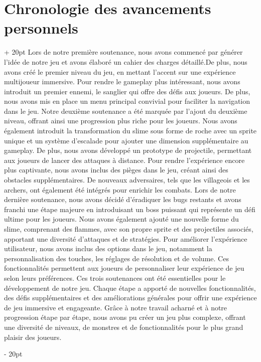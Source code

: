 \documentclass[a4paper, 12pt, twoside]{article}
\newcommand{\ind}[1][20pt]{\advance\leftskip + #1}
\newcommand{\deind}[1][20pt]{\advance\leftskip - #1}
\newenvironment{indt}[2][20pt]{#2 \par \ind[#1]}{\par \deind} %
\begin{document}
    \begin{indt}{\section{Chronologie des avancements personnels}}
        Lors de notre première soutenance, nous avons commencé par générer l'idée de notre jeu et avons élaboré un cahier des charges détaillé.De plus, nous avons créé le premier niveau du jeu, en mettant l'accent sur une expérience multijoueur immersive. Pour rendre le gameplay plus intéressant, nous avons introduit un premier ennemi, le sanglier qui offre des défis aux joueurs. De plus, nous avons mis en place un menu principal convivial pour faciliter la navigation dans le jeu.
        Notre deuxième soutenance a été marquée par l'ajout du deuxième niveau, offrant ainsi une progression plus riche pour les joueurs. Nous avons également introduit la transformation du slime sous forme de roche avec un sprite unique et un système d'escalade pour ajouter une dimension supplémentaire au gameplay. De plus, nous avons développé un prototype de projectile, permettant aux joueurs de lancer des attaques à distance. Pour rendre l'expérience encore plus captivante, nous avons inclus des pièges dans le jeu, créant ainsi des obstacles supplémentaires. De nouveaux adversaires, tels que les villageois et les archers, ont également été intégrés pour enrichir les combats.
        Lors de notre dernière soutenance, nous avons décidé d’éradiquer les bugs restants et avons franchi une étape majeure en introduisant un boss puissant qui représente un défi ultime pour les joueurs. Nous avons également ajouté une nouvelle forme du slime, comprenant des flammes, avec son propre sprite et des projectiles associés, apportant une diversité d'attaques et de stratégies. Pour améliorer l'expérience utilisateur, nous avons inclus des options dans le jeu, notamment la personnalisation des touches, les réglages de résolution et de volume. Ces fonctionnalités permettent aux joueurs de personnaliser leur expérience de jeu selon leurs préférences.
        Ces trois soutenances ont été essentielles pour le développement de notre jeu. Chaque étape a apporté de nouvelles fonctionnalités, des défis supplémentaires et des améliorations générales pour offrir une expérience de jeu immersive et engageante. Grâce à notre travail acharné et à notre progression étape par étape, nous avons pu créer un jeu plus complexe, offrant une diversité de niveaux, de monstres et de fonctionnalités pour le plus grand plaisir des joueurs.


\end{indt}
\end{document}

